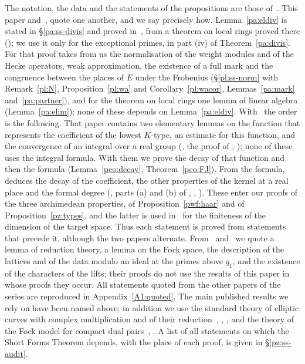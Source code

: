 \documentclass[10pt]{amsart}
\theoremstyle{definition}
\theoremstyle{remark}
\begin{document}
The notation, the data and the statements of the propositions are those of~\cite{P46}. This
paper and~\cite{P50}, \cite{P51} quote one another, and we say precisely how. Lemma~\ref{pa:eldiv}
is stated in \S\ref{pa:ss-divis} and proved in~\cite{P50}, from a theorem on local rings proved there ({\cite[Theorem~2.2]{P50}}); we use it only for the exceptional primes, in part (iv) of Theorem~\ref{pa:divis}. For that proof \cite{P50} takes from us the normalisation of the weight modules
and of the Hecke operators, weak approximation, the existence of a full mark and the congruence between the places of $E$ under
the Frobenius (\S\ref{pl:ss-norm} with Remark~\ref{pl:N}, Proposition~\ref{pl:wa} and Corollary~\ref{pl:wacor}, Lemmas~\ref{pa:mark} and~\ref{pa:partner}), and for the theorem on local rings one lemma of linear algebra (Lemma~\ref{pa:elim}); none of
these depends on Lemma~\ref{pa:eldiv}. With~\cite{P51} the order is the following. That paper contains two elementary lemmas on the function
that represents the coefficient of the lowest $K$-type, an estimate for this function, and the convergence of an integral over a real group
({\cite[Lemmas~5.4 and~5.5]{P51}}, the proof of {\cite[Theorem~5.6]{P51}}, {\cite[Lemma~4.7(c)]{P51}}); none of these uses the integral
formula. With them we prove the decay of that function and then the formula (Lemma~\ref{pco:decay}, Theorem~\ref{pco:FJ}). From the formula, \cite{P51}
deduces the decay of the coefficient, the other properties of the kernel at a real place and the formal degree ({\cite[Theorem~5.6]{P51}}, parts (a) and (b) of {\cite[Lemma~4.7]{P51}}, {\cite[Lemma~4.8]{P51}},
{\cite[Corollary~4.43]{P51}}). These enter our proofs of the three archimedean properties, of Proposition~\ref{pwf:haar} and
of Proposition~\ref{pz:types}, and the latter is used in~\cite{P51} for the finiteness of the
dimension of the target space. Thus each statement is proved from statements that precede it,
although the two papers alternate. From~\cite{P53} and~\cite{P54} we quote a lemma of reduction
theory, a lemma on the Fock space, the description of the lattices and of the data modulo an ideal
at the primes above $q_1$, and the existence of the characters of the lifts; their proofs do not
use the results of this paper in whose proofs they occur. All statements quoted
from the other papers of the series are reproduced in Appendix~\ref{A1:quoted}. The main published
results we rely on have been named above; in addition we use the standard theory of elliptic
curves with complex multiplication and of their reduction~\cite{SilvermanAEC}, \cite{SilvermanAT},
\cite{LangEF}, and the theory of the Fock model for compact dual pairs~\cite{HoweTheta},
\cite{KashiwaraVergne}. A list of all statements on which the Short Forms Theorem depends, with
the place of each proof, is given in \S\ref{pz:ss-audit}.
\end{document}

